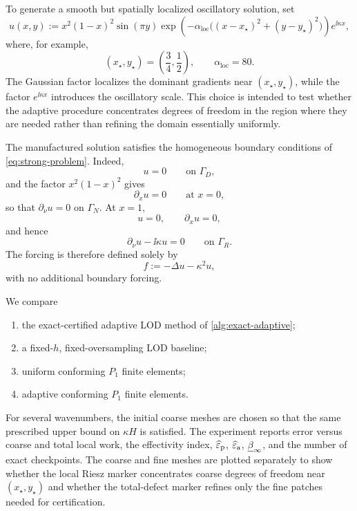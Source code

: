 To generate a smooth but spatially localized oscillatory solution, set
\begin{equation}
\label{eq:smooth-manufactured}
  u(x,y)
  :=
  x^2(1-x)^2
  \sin(\pi y)
  \exp\!\left(
    -\alpha_{\mathrm{loc}}
    \bigl((x-x_\star)^2+(y-y_\star)^2\bigr)
  \right)
  e^{\ii\kappa x},
\end{equation}
where, for example,
\[
  (x_\star,y_\star)
  =
  \left(\frac34,\frac12\right),
  \qquad
  \alpha_{\mathrm{loc}}=80.
\]
The Gaussian factor localizes the dominant gradients near
$(x_\star,y_\star)$, while the factor $e^{\ii\kappa x}$ introduces the
oscillatory scale. This choice is intended to test whether the adaptive
procedure concentrates degrees of freedom in the region where they are
needed rather than refining the domain essentially uniformly.

The manufactured solution satisfies the homogeneous boundary conditions
of \eqref{eq:strong-problem}. Indeed,
\[
  u=0
  \qquad\text{on }\Gamma_D,
\]
and the factor $x^2(1-x)^2$ gives
\[
  \partial_xu=0
  \qquad\text{at }x=0,
\]
so that $\partial_\nu u=0$ on $\Gamma_N$. At $x=1$,
\[
  u=0,
  \qquad
  \partial_xu=0,
\]
and hence
\[
  \partial_\nu u-\ii\kappa u=0
  \qquad\text{on }\Gamma_R.
\]
The forcing is therefore defined solely by
\begin{equation}
\label{eq:smooth-forcing}
  f
  :=
  -\Delta u-\kappa^2u,
\end{equation}
with no additional boundary forcing.


We compare
\begin{enumerate}
\item the exact-certified adaptive LOD method of
      \cref{alg:exact-adaptive};
\item a fixed-$h$, fixed-oversampling LOD baseline;
\item uniform conforming $P_1$ finite elements;
\item adaptive conforming $P_1$ finite elements.
\end{enumerate}
For several wavenumbers, the initial coarse meshes are chosen so that the
same prescribed upper bound on $\kappa H$ is satisfied.  The experiment
reports error versus coarse and total local work, the effectivity index,
$\widehat\varepsilon_{\mathrm p}$, $\widehat\varepsilon_{\mathrm a}$, $\underline\beta_\infty$, and the number of exact checkpoints.  The
coarse and fine meshes are plotted separately to show whether the local
Riesz marker concentrates coarse degrees of freedom near
$(x_\star,y_\star)$ and whether the total-defect marker refines only the
fine patches needed for certification.

